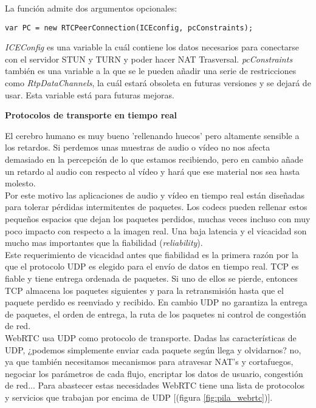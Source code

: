\noindent La función admite dos argumentos opcionales: 

\begin{lstlisting}[caption=Llamada a función RTCPeerConnection]
var PC = new RTCPeerConnection(ICEconfig, pcConstraints);
\end{lstlisting}

\textit{ICEConfig} es una variable la cuál contiene los datos necesarios para conectarse con el servidor STUN y TURN y poder hacer NAT Trasversal. \textit{pcConstraints} también es una variable a la que se le pueden añadir una serie de restricciones como \textit{RtpDataChannels}, la cuál estará obsoleta en futuras versiones y se dejará de usar. Esta variable está para futuras mejoras.\\

\begin{normalsize}
\noindent \textbf{Protocolos de transporte en tiempo real}\\
\end{normalsize}

El cerebro humano es muy bueno 'rellenando huecos' pero altamente sensible a los retardos. Si perdemos unas muestras de audio o vídeo no nos afecta demasiado en la percepción de lo que estamos recibiendo, pero en cambio añade un retardo al audio con respecto al vídeo y hará que ese material nos sea hasta molesto.\\

Por este motivo las aplicaciones de audio y vídeo en tiempo real están diseñadas para tolerar pérdidas intermitentes de paquetes. Los codecs pueden rellenar estos pequeños espacios que dejan los paquetes perdidos, muchas veces incluso con muy poco impacto con respecto a la imagen real. Una baja latencia y el vicacidad son mucho mas importantes que la fiabilidad (\emph{reliability}).\\

Este requerimiento de vicacidad antes que fiabilidad es la primera razón por la que el protocolo UDP es elegido para el envío de datos en tiempo real. TCP es fiable y tiene entrega ordenada de paquetes. Si uno de ellos se pierde, entonces TCP almacena los paquetes siguientes y para la retransmisión hasta que el paquete perdido es reenviado y recibido. En cambio UDP no garantiza la entrega de paquetes, el orden de entrega, la ruta de los paquetes ni control de congestión de red.\\

WebRTC usa UDP como protocolo de transporte. Dadas las características de UDP, ¿podemos simplemente enviar cada paquete según llega y olvidarnos? no, ya que también necesitamos mecanismos para atravesar NAT's y cortafuegos, negociar los parámetros de cada flujo, encriptar los datos de usuario, congestión de red... Para abastecer estas necesidades WebRTC tiene una lista de protocolos y servicios que trabajan por encima de UDP [(figura \ref{fig:pila_webrtc})].\\

